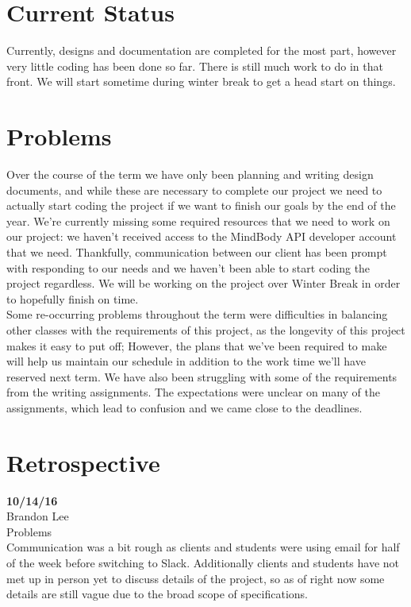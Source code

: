 \documentclass[letterpaper,10pt,titlepage]{article}
\begin{document}
\section{Current Status}

Currently, designs and documentation are completed for the most part, however very little coding has been done so far. There is still much work to do in that front. We will start sometime during winter break to get a head start on things.

\section{Problems}

Over the course of the term we have only been planning and writing design documents, and while these are necessary to complete our project  we need to actually start coding the project if we want to finish our goals by the end of the year. We're currently missing some required resources that we need to work on our project: we haven't received access to the MindBody API developer account that we need.
Thankfully, communication between our client has been prompt with responding to our needs and we haven't been able to start coding the project regardless. We will be working on the project over Winter Break in order to hopefully finish on time. \\


Some re-occurring problems throughout the term were difficulties in balancing other classes with the requirements of this project, as the longevity of this project makes it easy to put off; However, the plans that we've been required to make will help us maintain our schedule in addition to the work time we'll have reserved next term. We have also been struggling with some of the requirements from the writing assignments. The expectations were unclear on many of the assignments, which lead to confusion and we came close to the deadlines.



\section{Retrospective}

\textbf{10/14/16}\\

Brandon Lee\\

Problems\\
Communication was a bit rough as clients and students were using email for half of the week before switching to Slack.
Additionally clients and students have not met up in person yet to discuss details of the project, so as of right now some details are still vague due to the broad scope of specifications.\\
\end{document}
